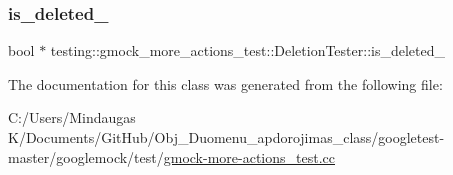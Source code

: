 \subsubsection{\texorpdfstring{is\_deleted\_}{is\_deleted\_}}
{\footnotesize\ttfamily bool $\ast$ testing\+::gmock\+\_\+more\+\_\+actions\+\_\+test\+::\+Deletion\+Tester\+::is\+\_\+deleted\+\_\+\hspace{0.3cm}{\ttfamily [private]}}



The documentation for this class was generated from the following file\+:\begin{DoxyCompactItemize}
\item 
C\+:/\+Users/\+Mindaugas K/\+Documents/\+Git\+Hub/\+Obj\+\_\+\+Duomenu\+\_\+apdorojimas\+\_\+class/googletest-\/master/googlemock/test/\mbox{\hyperlink{googletest-master_2googlemock_2test_2gmock-more-actions__test_8cc}{gmock-\/more-\/actions\+\_\+test.\+cc}}\end{DoxyCompactItemize}
